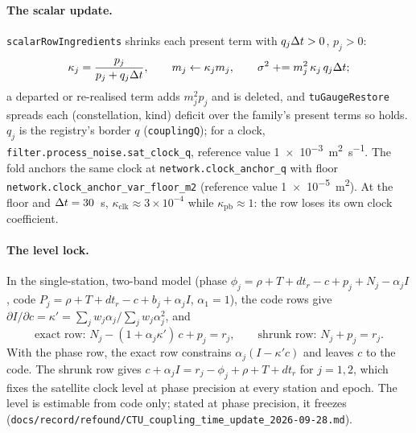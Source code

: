 \documentclass[main.tex]{subfiles}
\begin{document}
\paragraph{The scalar update.}
\texttt{scalarRowIngredients} shrinks each present term with $q_j\Delta t > 0$,
$p_j > 0$:
\begin{equation}
\kappa_j = \frac{p_j}{p_j + q_j\Delta t},
\qquad
m_j \leftarrow \kappa_j m_j,
\qquad
\sigma^2 \mathrel{+}= m_j^2\,\kappa_j\,q_j\Delta t ;
\label{eq:veh-kappa}
\end{equation}
a departed or re-realised term adds $m_j^2 p_j$ and is deleted, and
\texttt{tuGaugeRestore} spreads each (constellation, kind) deficit over the
family's present terms so  holds. $q_j$ is the
registry's border $q$ (\texttt{couplingQ}); for a clock,
\texttt{filter.process\_noise.sat\_clock\_q}, reference value
\SI{1e-3}{\metre\squared\per\second}. The fold anchors the same clock at
\texttt{network.clock\_anchor\_q} with floor
\texttt{network.clock\_anchor\_var\_floor\_m2} (reference value
\SI{1e-5}{\metre\squared}). At the floor and $\Delta t = 30$~s,
$\kappa_{\mathrm{clk}} \approx 3\times10^{-4}$ while $\kappa_{\mathrm{pb}}
\approx 1$: the row loses its own clock coefficient.

\paragraph{The level lock.}
In the single-station, two-band model (phase
$\phi_j = \rho + T + dt_r - c + p_j + N_j - \alpha_j I$, code
$P_j = \rho + T + dt_r - c + b_j + \alpha_j I$, $\alpha_1 = 1$), the code
rows give $\partial I/\partial c = \kappa' = \sum_j w_j\alpha_j / \sum_j
w_j\alpha_j^2$, and
\begin{equation}
\text{exact row: } N_j - (1+\alpha_j\kappa')\,c + p_j = r_j,
\qquad
\text{shrunk row: } N_j + p_j = r_j .
\label{eq:veh-lock}
\end{equation}
With the phase row, the exact row constrains $\alpha_j(I - \kappa' c)$ and
leaves $c$ to the code. The shrunk row gives $c + \alpha_j I = r_j - \phi_j
+ \rho + T + dt_r$ for $j = 1,2$, which fixes the satellite clock level at
phase precision at every station and epoch. The level is estimable from
code only; stated at phase precision, it freezes
(\texttt{docs/record/refound/CTU\_coupling\_time\_update\_2026-09-28.md}).
\end{document}
